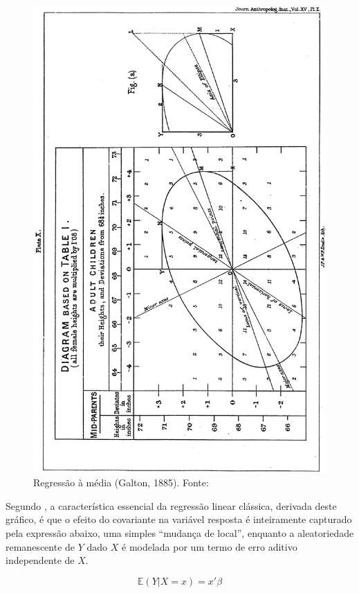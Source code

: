 \documentclass[a4paper, 12pt]{article}
\begin{document}
\begin{figure}
\centering
\includegraphics{image_Galton.png}
\caption{Regressão à média (Galton, 1885). Fonte:
\textcite[348]{koenker2000}}
\end{figure}

Segundo \textcite[p.~349]{koenker2000}, a característica essencial da
regressão linear clássica, derivada deste gráfico, é que o efeito do
covariante na variável resposta é inteiramente capturado pela expressão
abaixo, uma simples ``mudança de local'', enquanto a aleatoriedade
remanescente de \(Y\) dado \(X\) é modelada por um termo de erro aditivo
independente de \(X\).

\[\mathbb{E}(Y|X = x) = x'\beta\]
\end{document}
